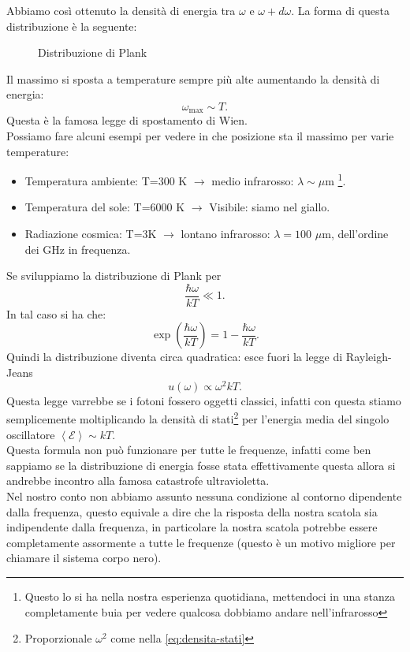 Abbiamo così ottenuto la densità di energia tra $\omega $ e $\omega + d\omega $. La forma di questa distribuzione è la seguente:
\begin{figure}[H]
    \centering
    \caption{Distribuzione di Plank}
    \label{fig:distribuzione-di-plank}
\end{figure}
\noindent
Il massimo si sposta a temperature sempre più alte aumentando la densità di energia:
\[
	\omega _{\text{max}} \sim T
.\] 
Questa è la famosa legge di spostamento di Wien. \\
Possiamo fare alcuni esempi per vedere in che posizione sta il massimo per varie temperature:
\begin{itemize}
	\item Temperatura ambiente: T=300 K $\to $ medio infrarosso: $\lambda \sim \mu$m \footnote{Questo lo si ha nella nostra esperienza quotidiana, mettendoci in una stanza completamente buia per vedere qualcosa dobbiamo andare nell'infrarosso}.
	\item Temperatura del sole: T=6000 K $\to $ Visibile: siamo nel giallo.
	\item Radiazione cosmica: T=3K $\to $ lontano infrarosso: $\lambda = 100$ $\mu$m, dell'ordine dei GHz in frequenza.
\end{itemize}
Se sviluppiamo la distribuzione di Plank per
\[
	\frac{\hbar \omega }{kT} \ll 1
.\] 
In tal caso si ha che:
\[
	\exp\left( \frac{\hbar \omega }{kT} \right) = 1 - \frac{\hbar \omega }{kT}
.\] 
Quindi la distribuzione diventa circa quadratica: esce fuori la legge di Rayleigh-Jeans
\[
	u( \omega ) \propto \omega ^2 kT 
.\] 
Questa legge varrebbe se i fotoni fossero oggetti classici, infatti con questa stiamo semplicemente moltiplicando la densità di stati\footnote{Proporzionale $\omega ^2$ come nella \ref{eq:densita-stati}} per l'energia media del singolo oscillatore $\left<\mathcal{E}  \right> \sim kT$.\\
Questa formula non può funzionare per tutte le frequenze, infatti come ben sappiamo se la distribuzione di energia fosse stata effettivamente questa allora si andrebbe incontro alla famosa catastrofe ultravioletta.\\
Nel nostro conto non abbiamo assunto nessuna condizione al contorno dipendente dalla frequenza, questo equivale a dire che la risposta della nostra scatola sia indipendente dalla frequenza, in particolare la nostra scatola potrebbe essere completamente assormente a tutte le frequenze (questo è un motivo migliore per chiamare il sistema corpo nero).\\
